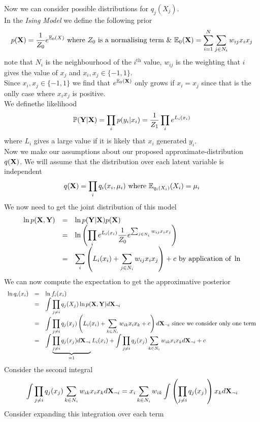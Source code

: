 \documentclass[11pt,a4paper]{article}
\begin{document}
Now we can consider possible distributions for $q_j(X_j)$.\\
In the \textit{Ising Model} we define the following prior
$$p(\textbf{X})=\frac{1}{Z_0}e^{\mathbb{E}_0(X)}\text{ where }Z_0\text{ is a normalising term \& }\mathbb{E}_0(\textbf{X})=\sum_{i=1}^N\sum_{j\in N_i}w_{ij}x_ix_j$$
note that $N_i$ is the neighbourhood of the $i^\text{th}$ value, $w_{ij}$ is the weighting that $i$ gives the value of $x_j$ and $x_i,x_j\in\{-1,1\}$.\\
Since $x_i,x_j\in\{-1,1\}$ we find that $e^{\mathbb{E}_0(\textbf{X})}$ only grows if $x_i=x_j$ since that is the onlly case where $x_ix_j$ is positive.\\
We definethe likelihood
$$\mathbb{P}(\textbf{Y}|\textbf{X})=\prod_ip(y_i|x_i)=\frac{1}{Z_1}\prod_ie^{L_i(x_i)}$$
where $L_i$ gives a large value if it is likely that $x_i$ generated $y_i$.\\
Now we make our assumptions about our proposed approximate-distribution $q(\textbf{X})$. We will assume that the distribution over each latent variable is independent
$$q(\textbf{X})=\prod_i q_i(x_i,\mu_i)\text{ where }\mathbb{E}_{q_i(X_i)}(X_i)=\mu_i$$
We now need to get the joint distribution of this model
\[\begin{array}{rcl}
\ln p(\textbf{X},\textbf{Y})&=&\ln p(\textbf{Y}|\textbf{X})p(\textbf{X})\\
&=&{\displaystyle\ln\left(\prod_ie^{L_i(x_i)}\dfrac{1}{Z_0}e^{\sum_{j\in N_i}w_{ij}x_ix_j}\right)}\\
&=&{\displaystyle\sum_i\left(L_i(x_i)+\sum_{j\in N_i}w_{ij}x_ix_j\right)}+c\text{ by application of }\ln
\end{array}\]
We can now compute the expectation to get the approximative posterior
\[\begin{array}{rcl}
\ln q_i(x_i)&=&\ln f_i(x_i)\\
&=&{\displaystyle\int\prod_{j\neq i}q_j(X_j)\ln p(\textbf{X},\textbf{Y})d\textbf{X}_{\neg i}}\\
&=&{\displaystyle\int\prod_{j\neq i}q_j(x_j)\left(L_i(x_i)+\sum_{k\in N_i}w_{ik}x_ix_k+c\right)d\textbf{X}_{\neg i}}\text{ since we consider only one term}\\
&=&{\displaystyle\int\underbrace{\prod_{j\neq i}q_j(x_j)d\textbf{X}_{\neg i}}_{=1}L_i(x_i)+\int\prod_{j\neq i}q_j(x_j)\sum_{k\in N_i}w_{ik}x_ix_kd\textbf{X}_{\neg i}+c}
\end{array}\]
Consider the second integral
$$\int\prod_{j\neq i}q_j(x_j)\sum_{k\in N_i}w_{ik}x_ix_kd\textbf{X}_{\neg i}=x_i\sum_{k\in N_i}w_{ik}\int\left(\prod_{j\neq i}q_j(x_j)\right)x_kd\textbf{X}_{\neg i}$$
Consider expanding this integration over each term
\end{document}
